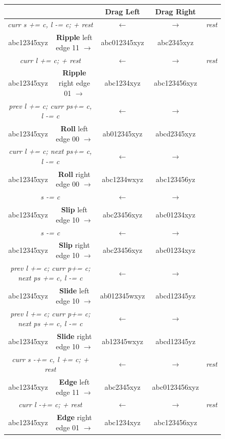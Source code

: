 \begin{figure}
\begin{longtable}{c c c c c}
    \toprule
    & & \textbf{Drag Left} & \textbf{Drag Right} & \\
    \midrule
    \endhead
    \multicolumn{2}{c}{\textit{curr s += c, l -= c; + rest}} & $\leftarrow$ & $\rightarrow$ & \textit{rest} \\
    abc12345xyz & \textbf{Ripple} left edge 11 $\rightarrow$ & abc012345xyz & abc2345xyz & \\
    \midrule
    \multicolumn{2}{c}{\textit{curr l += c; + rest}} & $\leftarrow$ & $\rightarrow$ & \textit{rest} \\
    abc12345xyz & \textbf{Ripple} right edge 01 $\rightarrow$ & abc1234xyz & abc123456xyz & \\
    \midrule
    \multicolumn{2}{c}{\textit{prev l += c; curr ps+= c, l -= c}} & $\leftarrow$ & $\rightarrow$ & \\
    abc12345xyz & \textbf{Roll} left edge 00 $\rightarrow$ & ab012345xyz & abcd2345xyz & \\
    \midrule
    \multicolumn{2}{c}{\textit{curr l += c; next ps+= c, l -= c}} & $\leftarrow$ & $\rightarrow$ & \\
    abc12345xyz & \textbf{Roll} right edge 00 $\rightarrow$ & abc1234wxyz & abc123456yz & \\
    \midrule
    \multicolumn{2}{c}{\textit{s -= c}} & $\leftarrow$ & $\rightarrow$ & \\
    abc12345xyz & \textbf{Slip} left edge 10 $\rightarrow$ & abc23456xyz & abc01234xyz & \\
    \midrule
    \multicolumn{2}{c}{\textit{s -= c}} & $\leftarrow$ & $\rightarrow$ & \\
    abc12345xyz & \textbf{Slip} right edge 10 $\rightarrow$ & abc23456xyz & abc01234xyz & \\
    \midrule
    \multicolumn{2}{c}{\textit{prev l += c; curr p+= c; next ps += c, l -= c}} & $\leftarrow$ & $\rightarrow$ & \\
    abc12345xyz & \textbf{Slide} left edge 10 $\rightarrow$ & ab012345wxyz & abcd12345yz & \\
    \midrule
    \multicolumn{2}{c}{\textit{prev l += c; curr p+= c; next ps += c, l -= c}} & $\leftarrow$ & $\rightarrow$ & \\
    abc12345xyz & \textbf{Slide} right edge 10 $\rightarrow$ & ab12345wxyz & abcd12345yz & \\
    \midrule
    \multicolumn{2}{c}{\textit{curr s -+= c, l += c; + rest}} & $\leftarrow$ & $\rightarrow$ & \textit{rest} \\
    abc12345xyz & \textbf{Edge} left edge 11 $\rightarrow$ & abc2345xyz & abc0123456xyz & \\
    \midrule
    \multicolumn{2}{c}{\textit{curr l -+= c; + rest}} & $\leftarrow$ & $\rightarrow$ & \textit{rest} \\
    abc12345xyz & \textbf{Edge} right edge 01 $\rightarrow$ & abc1234xyz & abc123456xyz & \\
    \bottomrule
\end{longtable}


\end{figure}
